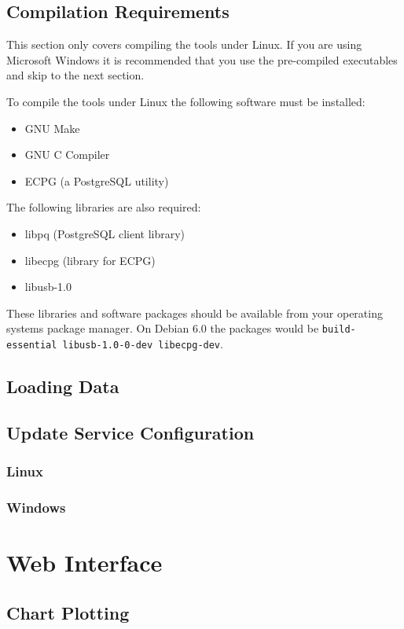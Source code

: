 \documentclass[a4paper,10pt,draft]{book}
\begin{document}
\section{Compilation Requirements}
This section only covers compiling the tools under Linux. If you are using Microsoft Windows it is recommended that you use the pre-compiled executables and skip to the next section.

To compile the tools under Linux the following software must be installed:
\begin{itemize}
\item GNU Make
\item GNU C Compiler
\item ECPG (a PostgreSQL utility)
\end{itemize}

The following libraries are also required:
\begin{itemize}
\item libpq (PostgreSQL client library)
\item libecpg (library for ECPG)
\item libusb-1.0
\end{itemize}

These libraries and software packages should be available from your operating systems package manager. On Debian 6.0 the packages would be \verb|build-essential libusb-1.0-0-dev libecpg-dev|.

\section{Loading Data}

\section{Update Service Configuration}
\subsection{Linux}
\subsection{Windows}


\chapter{Web Interface}
\section{Chart Plotting}
\end{document}
